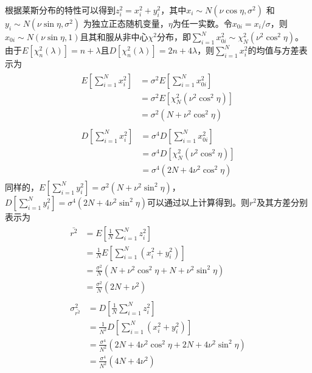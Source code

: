 根据莱斯分布的特性可以得到$z_i^2=x_i^2+y_i^2$，其中$x_i \sim N(\nu\cos \eta,\sigma^2)$ 和 $y_i \sim N(\nu\sin \eta,\sigma^2)$ 为独立正态随机变量，$\eta$为任一实数。令$x_{0i}=x_i/\sigma$，则$x_{0i} \sim N(\nu \sin \eta,1)$且其和服从非中心$\chi^2$分布，即$\sum_{i=1}^{N}x_{0i}^2 \sim \chi_N^2(\nu^2\cos^2\eta)$。由于$E[\chi_n^2(\lambda)]=n+\lambda$且$D[\chi_n^2(\lambda)]=2n+4\lambda$，则$\sum_{i=1}^{N}x_i^2$的均值与方差表示为
\begin{subequations}
\begin{eqnarray}
\begin{split}
  E\left[\sum_{i=1}^{N}x_i^2\right]&=\sigma^2E\left[\sum_{i=1}^{N}x_{0i}^2\right] \\
  &=\sigma^2E\left[\chi_N^2(\nu^2\cos^2\eta)\right] \\
  &=\sigma^2\left(N+\nu^2\cos^2\eta\right)
\label{app:Ex}
\end{split} \\
\begin{split}
  D\left[\sum_{i=1}^{N}x_i^2\right]&=\sigma^4D\left[\sum_{i=1}^{N}x_{0i}^2\right] \\
  &=\sigma^4D\left[\chi_N^2(\nu^2\cos^2\eta)\right] \\
  &=\sigma^4\left(2N+4\nu^2\cos^2\eta\right)
\label{app:Dx}
\end{split}
\end{eqnarray}
\label{app:x}
\end{subequations}
同样的，$E[\sum_{i=1}^{N}y_i^2]=\sigma^2(N+\nu^2\sin^2\eta)$，$D[\sum_{i=1}^{N}y_i^2]=\sigma^4(2N+4\nu^2\sin^2\eta)$可以通过以上计算得到。则$r^2$及其方差分别表示为
\begin{subequations}
\begin{eqnarray}
\begin{split}
  \bar{r^2}&=E\left[\frac{1}{N}\sum_{i=1}^{N}z_i^2\right] \\
    &=\frac{1}{N}E\left[\sum_{i=1}^{N}(x_i^2+y_i^2)\right]\\
    &=\frac{\sigma^2}{N}\left(N+\nu^2\cos^2\eta+N+\nu^2\sin^2\eta\right)\\
    &=\frac{\sigma^2}{N}\left(2N+\nu^2\right)
  \label{app:Er2}
\end{split} \\
\begin{split}
  \sigma_{\bar{r^2}}^2&=D\left[\frac{1}{N}\sum_{i=1}^{N}z_i^2\right] \\
    &=\frac{1}{N^2}D\left[\sum_{i=1}^{N}\left(x_i^2+y_i^2\right)\right]\\
    &=\frac{\sigma^4}{N^2}\left(2N+4\nu^2\cos^2\eta+2N+4\nu^2\sin^2\eta\right)\\
    &=\frac{\sigma^4}{N^2}\left(4N+4\nu^2\right)
  \label{app:Dr2}
\end{split}
\end{eqnarray}
\label{app:r2}
\end{subequations}
